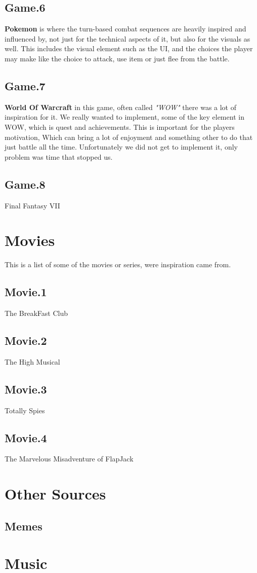 \subsection{Game.6}
\textbf{Pokemon} is where the turn-based combat sequences are heavily inspired and influenced by, not just for the technical aspects of it, but also for the visuals as well. This includes the visual element such as the UI, and the choices the player may make like the choice to attack, use item or just flee from the battle.
\cite{Pokemon}

\subsection{Game.7}
\textbf{World Of Warcraft} in this game, often called \textit{"WOW"} there was a lot of inspiration for it. We really wanted to implement, some of the key element in WOW, which is quest and achievements. This is important for the players motivation, Which can bring a lot of enjoyment and something other to do that just battle all the time. Unfortunately we did not get to implement it, only problem was time that stopped us.
\cite{Wow}

\subsection{Game.8}
Final Fantasy VII
\cite{FinalFVII}

\section{Movies}
\label{Movies}
This is a list of some of the movies or series, were inspiration came from.

\subsection{Movie.1}
The BreakFast Club
\cite{BreakFastClub}

\subsection{Movie.2}
The High Musical
\cite{HighSchoolMusical}

\subsection{Movie.3}
Totally Spies
\cite{TotallySpies}

\subsection{Movie.4}
The Marvelous Misadventure of FlapJack
\cite{FlapJack}

\section{Other Sources}
\label{sec:Other}


\subsection{Memes}
\label{sec:Memes}

\section{Music}
\label{sec:Music}